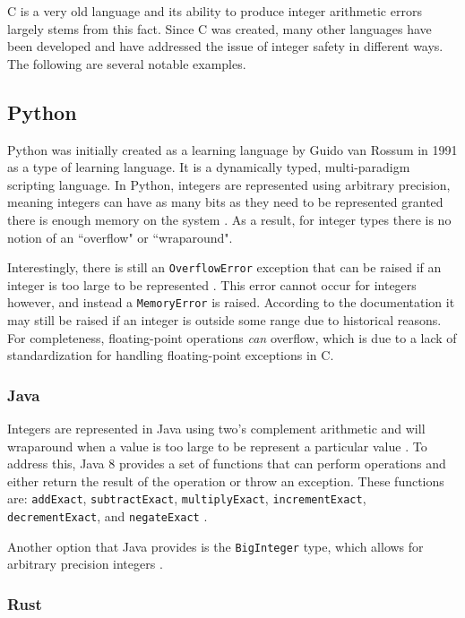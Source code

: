 C is a very old language and its ability to produce integer arithmetic errors largely stems from this fact. Since C was created, many other languages have been developed and have addressed the issue of integer safety in different ways. The following are several notable examples.

\subsection{Python}

Python was initially created as a learning language by Guido van Rossum in 1991 as a type of learning language. It is a dynamically typed, multi-paradigm scripting language. In Python, integers are represented using arbitrary precision, meaning integers can have as many bits as they need to be represented granted there is enough memory on the system \cite{python_types}. As a result, for integer types there is no notion of an ``overflow" or ``wraparound".

Interestingly, there is still an \texttt{OverflowError} exception that can be raised if an integer is too large to be represented \cite{python_overflow}. This error cannot occur for integers however, and instead a \texttt{MemoryError} is raised. According to the documentation it may still be raised if an integer is outside some range due to historical reasons. For completeness, floating-point operations \textit{can} overflow, which is due to a lack of standardization for handling floating-point exceptions in C.

\subsubsection{Java}

Integers are represented in Java using two's complement arithmetic and will wraparound when a value is too large to be represent a particular value \cite{java_int}. To address this, Java 8 provides a set of functions that can perform operations and either return the result of the operation or throw an exception. These functions are: \texttt{addExact}, \texttt{subtractExact}, \texttt{multiplyExact}, \texttt{incrementExact}, \texttt{decrementExact}, and \texttt{negateExact} \cite{java_exact}.

Another option that Java provides is the \texttt{BigInteger} type, which allows for arbitrary precision integers \cite{bigint}.

\subsubsection{Rust}

